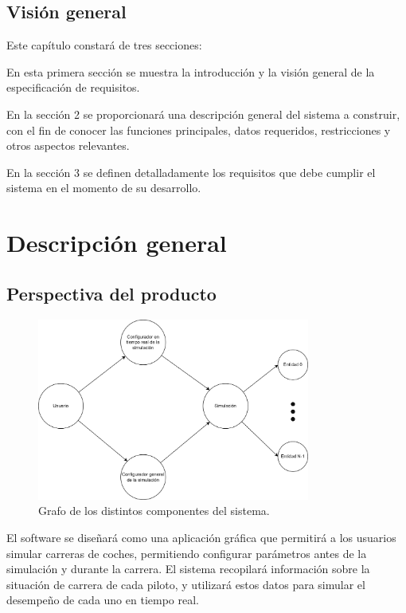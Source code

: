 \subsection{Visión general}
Este capítulo constará de tres secciones: %

\bigskip

En esta primera sección se muestra la introducción y la visión general de la especificación de requisitos.

\bigskip

En la sección 2 se proporcionará una descripción general del sistema a construir, con el fin de conocer las funciones principales, datos requeridos, restricciones y otros aspectos relevantes. 

\bigskip

En la sección 3 se definen detalladamente los requisitos que debe cumplir el sistema en el momento de su desarrollo.

\section{Descripción general}
\subsection{Perspectiva del producto}

\begin{figure}[H]
    \centering
    \includegraphics[width=0.8\textwidth]{imagenes/grafo-sistema.drawio.png}
    \caption{Grafo de los distintos componentes del sistema.}
 \end{figure}

El software se diseñará como una aplicación gráfica que permitirá a los usuarios simular carreras de coches, permitiendo configurar parámetros antes de la simulación y durante la carrera. El sistema recopilará información sobre la situación de carrera de cada piloto, y utilizará estos datos para simular el desempeño de cada uno en tiempo real.

